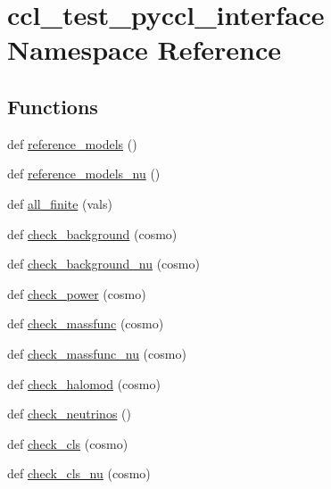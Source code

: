 \hypertarget{namespaceccl__test__pyccl__interface}{}\section{ccl\+\_\+test\+\_\+pyccl\+\_\+interface Namespace Reference}
\label{namespaceccl__test__pyccl__interface}
\subsection*{Functions}
\begin{DoxyCompactItemize}
\item 
def \mbox{\hyperlink{namespaceccl__test__pyccl__interface_af12cc81b73f2b986dbddf49f0b57759a}{reference\+\_\+models}} ()
\item 
def \mbox{\hyperlink{namespaceccl__test__pyccl__interface_a2d1bcf258dbc29d3e39ce74e3dff711e}{reference\+\_\+models\+\_\+nu}} ()
\item 
def \mbox{\hyperlink{namespaceccl__test__pyccl__interface_aecd07d8c3c95bccf7dad21e068684ad0}{all\+\_\+finite}} (vals)
\item 
def \mbox{\hyperlink{namespaceccl__test__pyccl__interface_abeb0e16edb05cf5ed17fd43254ea2d4b}{check\+\_\+background}} (cosmo)
\item 
def \mbox{\hyperlink{namespaceccl__test__pyccl__interface_afd5e77929d503c6eaed00a8a0975c13a}{check\+\_\+background\+\_\+nu}} (cosmo)
\item 
def \mbox{\hyperlink{namespaceccl__test__pyccl__interface_a0e14d8cd4b51c38207fa38e5ca127e38}{check\+\_\+power}} (cosmo)
\item 
def \mbox{\hyperlink{namespaceccl__test__pyccl__interface_af18b1262baf153cf44e7cd4fe4ebf02f}{check\+\_\+massfunc}} (cosmo)
\item 
def \mbox{\hyperlink{namespaceccl__test__pyccl__interface_ade98af8ec8a8309c2012c63e9a3766ae}{check\+\_\+massfunc\+\_\+nu}} (cosmo)
\item 
def \mbox{\hyperlink{namespaceccl__test__pyccl__interface_a54fc00031b869f3aa6aa6f383d0aeec8}{check\+\_\+halomod}} (cosmo)
\item 
def \mbox{\hyperlink{namespaceccl__test__pyccl__interface_a45d1e6f91fd168f5b48149bfdfa6aa8b}{check\+\_\+neutrinos}} ()
\item 
def \mbox{\hyperlink{namespaceccl__test__pyccl__interface_a52b035753596952f1d3d265ad903dcb3}{check\+\_\+cls}} (cosmo)
\item 
def \mbox{\hyperlink{namespaceccl__test__pyccl__interface_a1e444dede41317aa26bcdc16c0eaeb53}{check\+\_\+cls\+\_\+nu}} (cosmo)

\end{DoxyCompactItemize}
